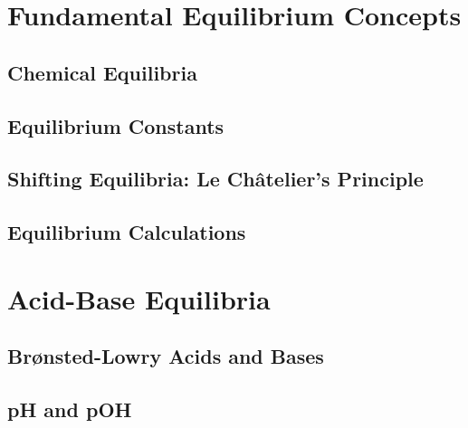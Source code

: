 \documentclass[12pt, openany, letterpaper]{memoir}
\begin{document}
\chapter{Fundamental Equilibrium Concepts}

\section{Chemical Equilibria}

\section{Equilibrium Constants}

\section{Shifting Equilibria: Le Ch\^atelier's Principle}

\section{Equilibrium Calculations}

\chapter{Acid-Base Equilibria}

\section{Brønsted-Lowry Acids and Bases}

\section{pH and pOH}
\end{document}
